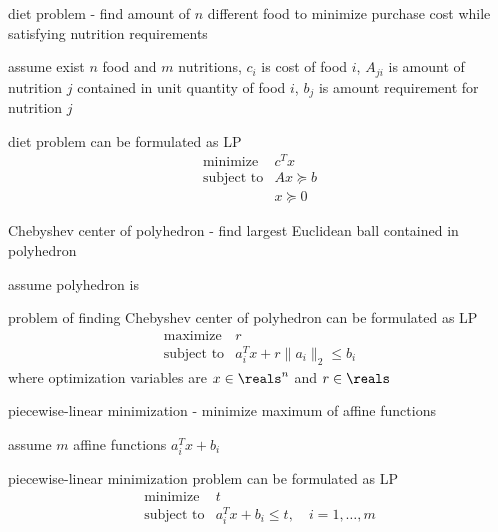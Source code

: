 \documentclass[17pt,landscape]{foils}
\begin{document}
{

\bit
\item
	diet problem
	-
	find amount of $n$ different food to minimize purchase cost
	while satisfying nutrition requirements
	\bit
	\item
		assume exist $n$ food and $m$ nutritions,
		$c_i$ is cost of food $i$,
		$A_{ji}$ is amount of nutrition $j$ contained in unit quantity of food $i$,
		$b_j$ is amount requirement for nutrition $j$
	\item
		diet problem can be formulated as LP
		$$
			\begin{array}{ll}
				\mbox{minimize}
					& c^Tx
				\\
				\mbox{subject to}
					& Ax \succeq b
				\\
					& x\succeq0
			\end{array}
		$$
	\eit

\item
	Chebyshev center of polyhedron
	- find largest Euclidean ball contained in polyhedron
	\bit
	\item
		assume polyhedron is \
	\item
		problem of finding Chebyshev center of polyhedron can be formulated as LP
		$$
			\begin{array}{ll}
				\mbox{maximize}
					& r
				\\
				\mbox{subject to}
					& a_i^T x + r\|a_i\|_2 \leq b_i
			\end{array}
		$$
		where optimization variables are $x\in\reals^n$ and $r\in\reals$
	\eit

\item
	piecewise-linear minimization
	- minimize maximum of affine functions
	\bit
	\item
		assume $m$ affine functions $a_i^Tx + b_i$
	\item
		piecewise-linear minimization problem
		can be formulated as LP
		$$
			\begin{array}{ll}
				\mbox{minimize}
					& t
				\\
				\mbox{subject to}
					& a_i^Tx + b_ i \leq t,\quad i=1,\ldots,m
			\end{array}
		$$

	\eit

}
\end{document}
